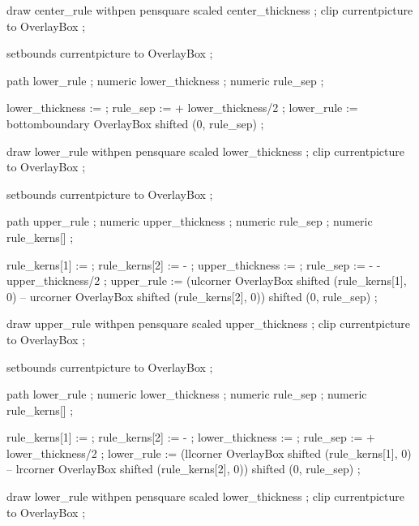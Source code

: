 draw center_rule withpen pensquare scaled center_thickness ;
clip currentpicture to OverlayBox ;

setbounds currentpicture to OverlayBox ;

\stopuseMPgraphic


path lower_rule ;
numeric lower_thickness ;
numeric rule_sep ;

lower_thickness :=  ;
rule_sep :=  + lower_thickness/2 ;
lower_rule := bottomboundary OverlayBox shifted (0, rule_sep) ;

draw lower_rule withpen pensquare scaled lower_thickness ;
clip currentpicture to OverlayBox ;

setbounds currentpicture to OverlayBox ; %

\stopuseMPgraphic


path upper_rule ;
numeric upper_thickness ;
numeric rule_sep ;
numeric rule_kerns[] ;

rule_kerns[1] :=  ;
rule_kerns[2] := - ;
upper_thickness :=  ;
rule_sep := - - upper_thickness/2 ;
upper_rule := (ulcorner OverlayBox shifted (rule_kerns[1], 0) -- urcorner OverlayBox shifted (rule_kerns[2], 0)) shifted (0, rule_sep) ;

draw upper_rule withpen pensquare scaled upper_thickness ;
clip currentpicture to OverlayBox ;

setbounds currentpicture to OverlayBox ;

\stopuseMPgraphic


path lower_rule ;
numeric lower_thickness ;
numeric rule_sep ;
numeric rule_kerns[] ;

rule_kerns[1] :=  ;
rule_kerns[2] := - ;
lower_thickness :=  ;
rule_sep :=  + lower_thickness/2 ;
lower_rule := (llcorner OverlayBox shifted (rule_kerns[1], 0) -- lrcorner OverlayBox shifted (rule_kerns[2], 0)) shifted (0, rule_sep) ;

draw lower_rule withpen pensquare scaled lower_thickness ;
clip currentpicture to OverlayBox ;

